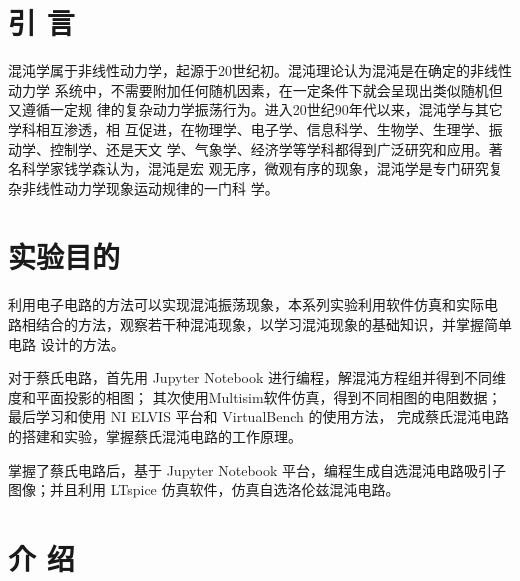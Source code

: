 \documentclass[10pt,a4paper,twoside,UTF8]{ctexart}
\begin{document}


\section{引 \quad 言}

混沌学属于非线性动力学，起源于20世纪初。混沌理论认为混沌是在确定的非线性动力学
系统中，不需要附加任何随机因素，在一定条件下就会呈现出类似随机但又遵循一定规
律的复杂动力学振荡行为。进入20世纪90年代以来，混沌学与其它学科相互渗透，相
互促进，在物理学、电子学、信息科学、生物学、生理学、振动学、控制学、还是天文
学、气象学、经济学等学科都得到广泛研究和应用。著名科学家钱学森认为，混沌是宏
观无序，微观有序的现象，混沌学是专门研究复杂非线性动力学现象运动规律的一门科
学。

\section{实验目的}

利用电子电路的方法可以实现混沌振荡现象，本系列实验利用软件仿真和实际电
路相结合的方法，观察若干种混沌现象，以学习混沌现象的基础知识，并掌握简单电路
设计的方法。

对于蔡氏电路，首先用 Jupyter Notebook 进行编程，解混沌方程组并得到不同维度和平面投影的相图；
其次使用Multisim软件仿真，得到不同相图的电阻数据；最后学习和使用 NI ELVIS 平台和 VirtualBench 的使用方法，
完成蔡氏混沌电路的搭建和实验，掌握蔡氏混沌电路的工作原理。

掌握了蔡氏电路后，基于 Jupyter Notebook 平台，编程生成自选混沌电路吸引子图像；并且利用 LTspice \autocite{LTspice}仿真软件，仿真自选洛伦兹混沌电路。

\section{介 \quad 绍\autocite{shenGeneralPhysicsLaboratory2015}}
\end{document}
